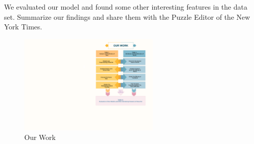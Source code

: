 \documentclass[12pt]{article}  %
\begin{document}
{\LARGE\CheckedBox} We evaluated our model and found some other interesting features in the data set. Summarize our findings and share them with the Puzzle Editor of the New York
Times.
\begin{figure}[htbp]
\centering
\includegraphics[width=0.6\textwidth]{img/OURWORK.pdf}
\caption{Our Work}
\end{figure}
\end{document}
